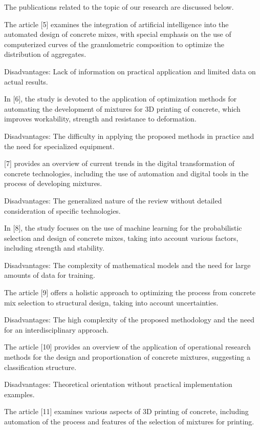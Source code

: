 \documentclass[
]{article}
\begin{document}
The publications related to the topic of our research are discussed
below.

The article {[}5{]} examines the integration of artificial intelligence
into the automated design of concrete mixes, with special emphasis on
the use of computerized curves of the granulometric composition to
optimize the distribution of aggregates.

Disadvantages: Lack of information on practical application and limited
data on actual results.

In {[}6{]}, the study is devoted to the application of optimization
methods for automating the development of mixtures for 3D printing of
concrete, which improves workability, strength and resistance to
deformation.

Disadvantages: The difficulty in applying the proposed methods in
practice and the need for specialized equipment.

{[}7{]} provides an overview of current trends in the digital
transformation of concrete technologies, including the use of automation
and digital tools in the process of developing mixtures.

Disadvantages: The generalized nature of the review without detailed
consideration of specific technologies.

In {[}8{]}, the study focuses on the use of machine learning for the
probabilistic selection and design of concrete mixes, taking into
account various factors, including strength and stability.

Disadvantages: The complexity of mathematical models and the need for
large amounts of data for training.

The article {[}9{]} offers a holistic approach to optimizing the process
from concrete mix selection to structural design, taking into account
uncertainties.

Disadvantages: The high complexity of the proposed methodology and the
need for an interdisciplinary approach.

The article {[}10{]} provides an overview of the application of
operational research methods for the design and proportionation of
concrete mixtures, suggesting a classification structure.

Disadvantages: Theoretical orientation without practical implementation
examples.

The article {[}11{]} examines various aspects of 3D printing of
concrete, including automation of the process and features of the
selection of mixtures for printing.
\end{document}
